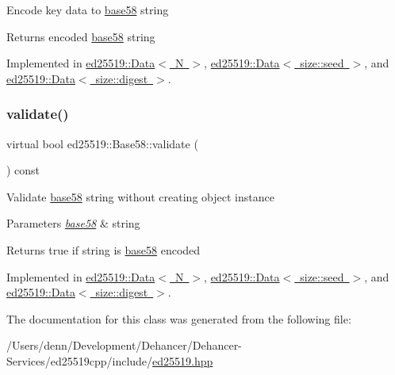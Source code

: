 Encode key data to \mbox{\hyperlink{namespaceed25519_1_1base58}{base58}} string \begin{DoxyReturn}{Returns}
encoded \mbox{\hyperlink{namespaceed25519_1_1base58}{base58}} string 
\end{DoxyReturn}


Implemented in \mbox{\hyperlink{classed25519_1_1_data_a2dc2e23b950a10b168d7509a63ffca53}{ed25519\+::\+Data$<$ N $>$}}, \mbox{\hyperlink{classed25519_1_1_data_a2dc2e23b950a10b168d7509a63ffca53}{ed25519\+::\+Data$<$ size\+::seed $>$}}, and \mbox{\hyperlink{classed25519_1_1_data_a2dc2e23b950a10b168d7509a63ffca53}{ed25519\+::\+Data$<$ size\+::digest $>$}}.

\mbox{\label{classed25519_1_1_base58_addfdb1d6d0f7e7f0cd0cf5dd2ee193bb}} 
\subsubsection{\texorpdfstring{validate()}{validate()}}
{\footnotesize\ttfamily virtual bool ed25519\+::\+Base58\+::validate (\begin{DoxyParamCaption}{ }\end{DoxyParamCaption}) const\hspace{0.3cm}{\ttfamily [pure virtual]}}

Validate \mbox{\hyperlink{namespaceed25519_1_1base58}{base58}} string without creating object instance 
\begin{DoxyParams}{Parameters}
{\em \mbox{\hyperlink{namespaceed25519_1_1base58}{base58}}} & string \\
\hline
\end{DoxyParams}
\begin{DoxyReturn}{Returns}
true if string is \mbox{\hyperlink{namespaceed25519_1_1base58}{base58}} encoded 
\end{DoxyReturn}


Implemented in \mbox{\hyperlink{classed25519_1_1_data_ac365c9862b45379c677449b622c74da5}{ed25519\+::\+Data$<$ N $>$}}, \mbox{\hyperlink{classed25519_1_1_data_ac365c9862b45379c677449b622c74da5}{ed25519\+::\+Data$<$ size\+::seed $>$}}, and \mbox{\hyperlink{classed25519_1_1_data_ac365c9862b45379c677449b622c74da5}{ed25519\+::\+Data$<$ size\+::digest $>$}}.



The documentation for this class was generated from the following file\+:\begin{DoxyCompactItemize}
\item 
/\+Users/denn/\+Development/\+Dehancer/\+Dehancer-\/\+Services/ed25519cpp/include/\mbox{\hyperlink{ed25519_8hpp}{ed25519.\+hpp}}\end{DoxyCompactItemize}
